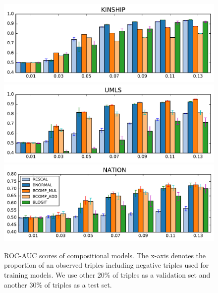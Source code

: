 \begin{figure}[t]
	\centering
	\includegraphics[width=\linewidth]{images/comp_training_error_kinship_small.pdf}
	\includegraphics[width=\linewidth]{images/comp_training_error_umls_small.pdf}			
	\includegraphics[width=\linewidth]{images/comp_training_error_nation_small.pdf}				
	\caption{\label{fig:r_vs_br} ROC-AUC scores of compositional models. 
	The x-axis denotes the proportion of an observed triples including negative triples used for training 
	models. We use other 20\% of triples as a validation set and another 30\% of triples as a test set. 
}
\end{figure} 

